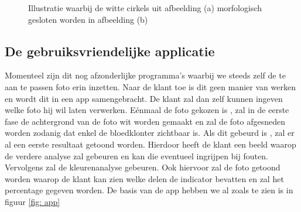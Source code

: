 \documentclass[a4paper,kulak]{kulakarticle}
\begin{document}
	\begin{figure}[H]
	\centering
	\qquad
	
	\caption{Illustratie waarbij de witte cirkels uit afbeelding (a) morfologisch gesloten worden in afbeelding (b)}
	\label{figuur morf}
	\end{figure}

	\subsection{De gebruiksvriendelijke applicatie}
		Momenteel zijn dit nog afzonderlijke programma's waarbij we steeds zelf de te aan te passen foto erin inzetten. Naar de klant toe is dit geen manier van werken en wordt dit in een app samengebracht. De klant zal dan zelf kunnen ingeven welke foto hij wil laten verwerken. Eénmaal de foto gekozen is , zal in de eerste fase de achtergrond van de foto wit worden gemaakt en zal de foto afgesneden worden zodanig dat enkel de bloedklonter zichtbaar is. Als dit gebeurd is , zal er al een eerste resultaat getoond worden. Hierdoor heeft de klant een beeld waarop de verdere analyse zal gebeuren en kan die eventueel ingrijpen bij fouten. Vervolgens zal de kleurenanalyse gebeuren. Ook hiervoor zal de foto getoond worden waarop de klant kan zien welke delen de indicator bevatten en zal het percentage gegeven worden. De basis van de app hebben we al zoals te zien is in  figuur \ref{fig: app}
	
\end{document}
